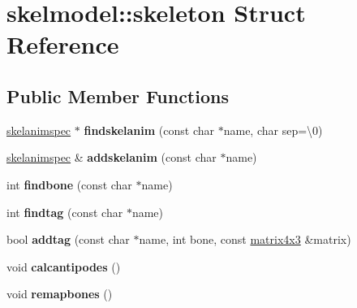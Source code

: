 \hypertarget{structskelmodel_1_1skeleton}{}\section{skelmodel\+:\+:skeleton Struct Reference}
\label{structskelmodel_1_1skeleton}
\subsection*{Public Member Functions}
\begin{DoxyCompactItemize}
\item 
\mbox{\label{structskelmodel_1_1skeleton_a36efa2f0a36cd23a09ddd5bd383fb24d}} 
\hyperlink{structskelmodel_1_1skelanimspec}{skelanimspec} $\ast$ {\bfseries findskelanim} (const char $\ast$name, char sep=\textquotesingle{}\textbackslash{}0\textquotesingle{})
\item 
\mbox{\label{structskelmodel_1_1skeleton_aa99ea032f925ed9529a1e44b200a4424}} 
\hyperlink{structskelmodel_1_1skelanimspec}{skelanimspec} \& {\bfseries addskelanim} (const char $\ast$name)
\item 
\mbox{\label{structskelmodel_1_1skeleton_a8271ab3be86ed850726b5bf733c592f2}} 
int {\bfseries findbone} (const char $\ast$name)
\item 
\mbox{\label{structskelmodel_1_1skeleton_a5a8e346d5300717105890e1dd5854e94}} 
int {\bfseries findtag} (const char $\ast$name)
\item 
\mbox{\label{structskelmodel_1_1skeleton_a373528f3e435847c244881b39248858b}} 
bool {\bfseries addtag} (const char $\ast$name, int bone, const \hyperlink{structmatrix4x3}{matrix4x3} \&matrix)
\item 
\mbox{\label{structskelmodel_1_1skeleton_add859f7b2522cadf15aab06b7351f7fa}} 
void {\bfseries calcantipodes} ()
\item 
\mbox{\label{structskelmodel_1_1skeleton_ad38eb738bef2c2a0bb4decb61542ae4f}} 
void {\bfseries remapbones} ()
\item 

\end{DoxyCompactItemize}
